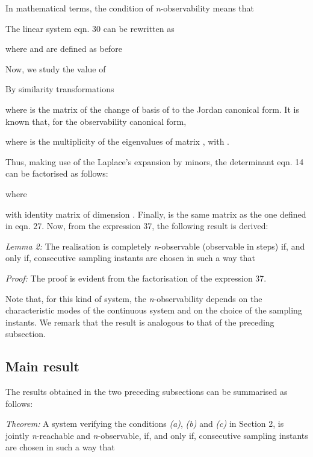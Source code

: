 \documentclass{article}
\begin{document}
In mathematical terms, the condition of \textit{n}-observability means that



The linear system eqn. 30 can be rewritten as


where  and  are defined as before



Now, we study the value of

By similarity transformations



where  is the matrix of
the change of basis of  to the Jordan canonical form. It is
known \cite{Kailath} that, for the observability canonical form,





where  is the multiplicity of the eigenvalues of matrix , with .

Thus, making use of the Laplace's expansion
by minors, the determinant eqn. 14 can be factorised as
follows:


where





with 
identity matrix of dimension . Finally,  is the same matrix as the one defined in eqn. 27. Now,
from the expression 37, the following result is derived:


\textit{Lemma 2:}
The realisation  is completely \textit{n}-observable (observable in
 steps) if, and only if,  consecutive sampling instants are
chosen in such a way that


\textit{Proof:} The proof is evident from the
factorisation of the expression 37.


Note that, for this kind of system, the \textit{n}-observability depends on the characteristic modes of
the continuous system and on the choice of the sampling instants.
We remark that the result is analogous to that of the preceding
subsection.



\subsection{Main result}
The results obtained in the two
preceding subsections can be summarised as follows:


\textit{Theorem:} A
system verifying the conditions \textit{(a)}, \textit{(b)} and \textit{(c)} in Section 2, is
jointly \textit{n}-reachable and \textit{n}-observable, if, and only if, 
consecutive sampling instants are chosen in such a way that
\end{document}
